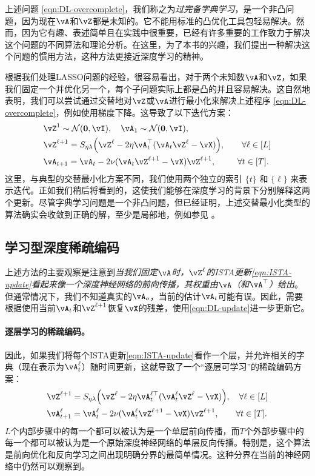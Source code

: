 \documentclass[../../book-main.tex]{subfiles}
\begin{document}
上述问题 \eqref{eqn:DL-overcomplete}，我们称之为\textit{过完备字典学习}，是一个非凸问题，因为现在\(\vA\)和\(\vZ\)都是未知的。它不能用标准的凸优化工具包轻易解决。然而，因为它有趣、表述简单且在实践中很重要，已经有许多重要的工作致力于解决这个问题的不同算法和理论分析。在这里，为了本书的兴趣，我们提出一种解决这个问题的惯用方法，这种方法更接近深度学习的精神。

根据我们处理LASSO问题的经验，很容易看出，对于两个未知数\(\vA\)和\(\vZ\)，如果我们固定一个并优化另一个，每个子问题实际上都是凸的并且容易解决。这自然地表明，我们可以尝试通过交替地对\(\vZ\)或\(\vA\)进行最小化来解决上述程序 \eqref{eqn:DL-overcomplete}，例如使用梯度下降。这导致了以下迭代方案：
\begin{align}
    & \vZ^{1}
     \sim \dNorm(\vzero, \vI), \quad \vA_{1}
     \sim \dNorm(\vzero, \vI), \\ 
    &\vZ^{\ell + 1} = S_{\eta\lambda}\rp{\vZ^{\ell} - 2\eta\vA_{t}^{\top}(\vA_{t}\vZ^{\ell} - \vX)}, \qquad \forall \ell \in [L] \label{eqn:ISTA-update}\\ 
    &\vA_{t + 1} = \vA_{t} - 2\nu (\vA_{t}\vZ^{\ell + 1} - \vX)\vZ^{\ell + 1}, \qquad\;\; \forall t \in [T].\label{eqn:DL-update}
\end{align}
这里，与典型的交替最小化方案不同，我们使用两个独立的索引 $\{t\}$ 和 $\{\ell\}$ 来表示迭代。正如我们稍后将看到的，这使我们能够在深度学习的背景下分别解释这两个更新。尽管字典学习问题是一个非凸问题，但已经证明，上述交替最小化类型的算法确实会收敛到正确的解，至少是局部地，例如参见 \cite{alekh-2016}。


\subsection{学习型深度稀疏编码}
\label{sec:LISTA}
上述方法的主要观察是注意到\textit{当我们固定\(\vA\)时，$\vZ^\ell$的ISTA更新\eqref{eqn:ISTA-update}看起来像一个深度神经网络的前向传播，其权重由\(\vA\)（和\(\vA^{\top}\)）给出}。但通常情况下，我们不知道真实的$\vA_o$，当前的估计$\vA_t$可能有误。因此，需要根据使用当前$\vA_t$和$\vZ^{\ell +1}$恢复$\vX$的残差，使用\eqref{eqn:DL-update}进一步更新它。


\paragraph{逐层学习的稀疏编码。}
因此，如果我们将每个ISTA更新\eqref{eqn:ISTA-update}看作一个层，并允许相关的字典（现在表示为$\vA_t^\ell$）随时间更新，这就导致了一个“逐层可学习”的稀疏编码方案：
\begin{align}
    & \vZ^{\ell + 1} = S_{\eta\lambda}\rp{\vZ^{\ell} - 2\eta\vA_{t}^{\ell\top}(\vA_{t}^\ell\vZ^{\ell} - \vX)}, \quad \forall \ell \in [L] \\ 
    & \vA_{t + 1}^\ell = \vA_{t}^\ell - 2\nu (\vA_{t}^\ell\vZ^{\ell + 1} - \vX)\vZ^{\ell + 1}, \qquad \forall t \in [T].
\end{align}
\(L\)个内部步骤中的每一个都可以被认为是一个单层前向传播，而\(T\)个外部步骤中的每一个都可以被认为是一个原始深度神经网络的单层反向传播。特别是，这个算法是前向优化和反向学习之间出现明确分界的最简单情况。这种分界在当前的神经网络中仍然可以观察到。
\end{document}

